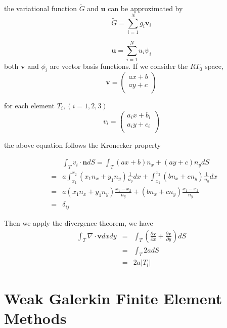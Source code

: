 the variational function $ \tilde{G} $ and $ \mathbf{u} $ can be approximated by 
\begin{equation}
\tilde{G} = \sum_{i = 1}^{N}g_{i} \mathbf{v}_{i}
\end{equation}

\begin{equation}
\mathbf{u} = \sum_{i = 1}^{N} u_{i} \psi_{i}
\end{equation}
both $ \mathbf{v} $ and $ \phi_{i} $ are vector basis functions. If we consider the $ RT_0 $ space, 
\begin{equation}
\mathbf{v} = \begin{pmatrix}
ax + b \\ ay + c\\
\end{pmatrix}
\end{equation}

for each element $ T_{i} , (i = 1, 2, 3)$
\begin{equation}
v_{i} = \begin{pmatrix}
a_{i} x + b_{i} \\ a_{i} y + c_{i}\\
\end{pmatrix}
\end{equation}

the above equation follows the Kronecker property \cite{davio1981kronecker}

\begin{eqnarray}
&&\int_{T} v_{i} \cdot \mathbf{n} dS = \int_{T} (ax + b)n_{x} + (ay + c)n_{y} dS\\
&=& a\int_{x_1}^{x_2} (x_1 n_x + y_1 n_y) \frac{1}{n_y} dx + \int_{x_1}^{x_2}(bn_x + cn_y) \frac{1}{n_y} dx  \\
&=& a(x_1 n_x + y_1 n_y) \frac{x_1 - x_2}{n_y} + (bn_x + cn_y) \frac{x_1 - x_2}{n_y} \\
&=& \delta_{ij}
\end{eqnarray}

Then we apply the divergence theorem, we have
\begin{eqnarray}
\int_{T} \nabla \cdot \mathbf{v} dx dy & = & \int_{T} (\frac{\partial \mathbf{v}}{\partial x} + \frac{\partial \mathbf{v}}{\partial y}) dS\\
&=& \int_{T} 2a dS \\
&=& 2a |T_{i}|
\end{eqnarray}


\section{Weak Galerkin Finite Element Methods}

